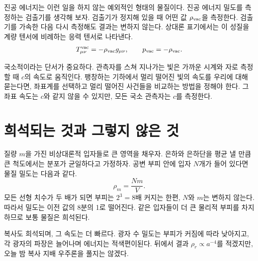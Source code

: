 진공 에너지는 이런 일을 하지 않는 예외적인 형태의 물질이다. 진공 에너지 밀도를 측정하는 검출기를 생각해 보자. 검출기가 정지해 있을 때 어떤 값 \(\rho_{\rm vac}\)을 측정한다. 검출기를 가속한 다음 다시 측정해도 결과는 변하지 않는다. 상대론 표기에서는 이 성질을 계량 텐서에 비례하는 응력 텐서로 나타낸다.
\begin{equation}
T_{\mu\nu}^{\rm vac}=-\rho_{\rm vac}g_{\mu\nu},
\qquad
p_{\rm vac}=-\rho_{\rm vac}.
\label{eq:l08-vacuum-stress}
\end{equation}

국소적이라는 단서가 중요하다. 관측자를 스쳐 지나가는 빛은 가까운 시계와 자로 측정할 때 \(c\)의 속도로 움직인다. 팽창하는 기하에서 멀리 떨어진 빛의 속도를 우리에 대해 묻는다면, 좌표계를 선택하고 멀리 떨어진 사건들을 비교하는 방법을 정해야 한다. 그 좌표 속도는 \(c\)와 같지 않을 수 있지만, 모든 국소 관측자는 \(c\)를 측정한다.

\begin{classroomqa}
\end{classroomqa}

\section{희석되는 것과 그렇지 않은 것}

질량 \(m\)을 가진 비상대론적 입자들로 큰 영역을 채우자. 은하와 은하단을 평균 낼 만큼 큰 척도에서는 분포가 균일하다고 가정하자. 공변 부피 안에 입자 \(N\)개가 들어 있다면 물질 밀도는 다음과 같다.
\begin{equation}
\rho_m=\frac{Nm}{V}.
\end{equation}
모든 선형 치수가 두 배가 되면 부피는 \(2^3=8\)배 커지는 한편, \(N\)와 \(m\)는 변하지 않는다. 따라서 밀도는 이전 값의 8분의 1로 떨어진다. 같은 입자들이 더 큰 물리적 부피를 차지하므로 보통 물질은 희석된다.

복사도 희석되며, 그 속도는 더 빠르다. 광자 수 밀도는 부피가 커짐에 따라 낮아지고, 각 광자의 파장은 늘어나며 에너지는 적색편이된다. 뒤에서 결과 \(\rho_r\propto a^{-4}\)를 적겠지만, 오늘 밤 복사 지배 우주론을 풀지는 않겠다.

